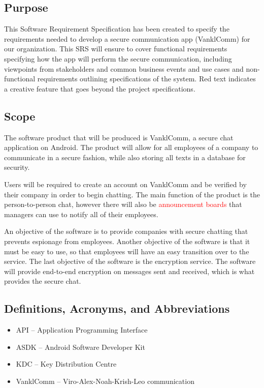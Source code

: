\documentclass[]{article}
\begin{document}
\subsection{Purpose}
\label{sub:purpose}
This Software Requirement Specification has been created to specify the requirements needed to develop a secure communication app (VanklComm) for our organization. This SRS will ensure to cover functional requirements specifying how the app will perform the secure communication, including viewpoints from stakeholders and common business events and use cases and non-functional requirements outlining specifications of the system. Red text indicates a creative feature that goes beyond the project specifications.

\subsection{Scope}
\label{sub:scope}
\par The software product that will be produced is VanklComm, a secure chat application on Android. The product will allow for all employees of a company to communicate in a secure fashion, while also storing all texts in a database for security.
\\
\par \noindent Users will be required to create an account on VanklComm and be verified by their company in order to begin chatting. The main function of the product is the person-to-person chat, however there will also be \textcolor{red}{announcement boards} that managers can use to notify all of their employees.
\\
\par \noindent An objective of the software is to provide companies with secure chatting that prevents espionage from employees. Another objective of the software is that it must be easy to use, so that employees will have an easy transition over to the service. The last objective of the software is the encryption service. The software will provide end-to-end encryption on messages sent and received, which is what provides the secure chat.


\subsection{Definitions, Acronyms, and Abbreviations}
\label{sub:definitions_acronyms_and_abbreviations}
\begin{itemize}
	\item API – Application Programming Interface
	\item ASDK – Android Software Developer Kit
	\item KDC – Key Distribution Centre
	\item VanklComm – Viro-Alex-Noah-Krish-Leo communication

\end{itemize}
\end{document}
